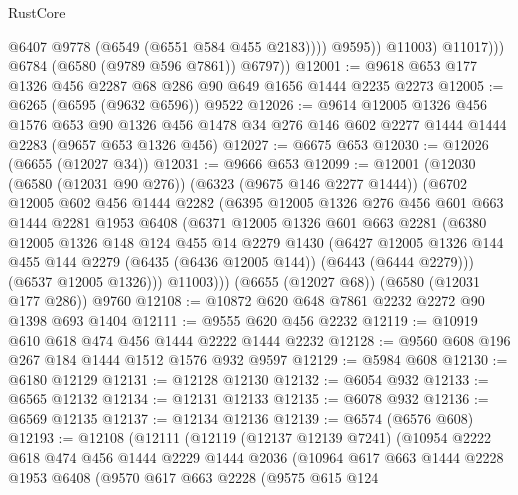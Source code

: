 \begin{lexlean}{RustCore}
\begin{coremodule}
{\begin{coremodule}
{{{{{{{{{{{{{{{{{{{{{{{{{{{{{{{{{{{{{{{{{{{{{                        @6407
                        @9778
                        (@6549 (@6551 @584 @455 @2183))))
                    @9595))
                @11003)
              @11017)))
        @6784
        (@6580 (@9789 @596 @7861))
        @6797))
@12001 := @9618 @653 @177 @1326 @456 @2287 @68 @286 @90 @649 @1656 @1444 @2235 @2273
@12005 := @6265 (@6595 (@9632 @6596)) @9522
@12026 := @9614
    @12005
    @1326
    @456
    @1576
    @653
    @90
    @1326
    @456
    @1478
    @34
    @276
    @146
    @602
    @2277
    @1444
    @1444
    @2283
    (@9657 @653 @1326 @456)
@12027 := @6675 @653
@12030 := @12026 (@6655 (@12027 @34))
@12031 := @9666 @653
@12099 := @12001
    (@12030
      (@6580 (@12031 @90 @276))
      (@6323 (@9675 @146 @2277 @1444))
      (@6702
        @12005
        @602
        @456
        @1444
        @2282
        (@6395
          @12005
          @1326
          @276
          @456
          @601
          @663
          @1444
          @2281
          @1953
          @6408
          (@6371
            @12005
            @1326
            @601
            @663
            @2281
            (@6380
              @12005
              @1326
              @148
              @124
              @455
              @14
              @2279
              @1430
              (@6427
                @12005
                @1326
                @144
                @455
                @144
                @2279
                (@6435 (@6436 @12005 @144))
                (@6443 (@6444 @2279)))
              (@6537 @12005 @1326)))
          @11003)))
    (@6655 (@12027 @68))
    (@6580 (@12031 @177 @286))
    @9760
@12108 := @10872 @620 @648 @7861 @2232 @2272 @90 @1398 @693 @1404
@12111 := @9555 @620 @456 @2232
@12119 := @10919 @610 @618 @474 @456 @1444 @2222 @1444 @2232
@12128 := @9560 @608 @196 @267 @184 @1444 @1512 @1576 @932 @9597
@12129 := @5984 @608
@12130 := @6180 @12129
@12131 := @12128 @12130
@12132 := @6054 @932
@12133 := @6565 @12132
@12134 := @12131 @12133
@12135 := @6078 @932
@12136 := @6569 @12135
@12137 := @12134 @12136
@12139 := @6574 (@6576 @608)
@12193 := @12108
    (@12111
      (@12119
        (@12137 @12139 @7241)
        (@10954
          @2222
          @618
          @474
          @456
          @1444
          @2229
          @1444
          @2036
          (@10964
            @617
            @663
            @1444
            @2228
            @1953
            @6408
            (@9570
              @617
              @663
              @2228
              (@9575
                @615
                @124
}}}}}}}}}}}}}}}}}}}}}}}}}}}}}}}}}}}}}}}}}}}}}
\end{coremodule}}
\end{coremodule}
\end{lexlean}
